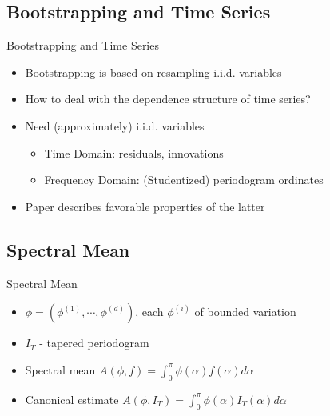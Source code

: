 
\subsection{Bootstrapping and Time Series}
\begin{frame}{Bootstrapping and Time Series}

\begin{itemize}
\item Bootstrapping is based on resampling i.i.d. variables

\item How to deal with the dependence structure of time series?

\item Need (approximately) i.i.d. variables
\begin{itemize}
\item Time Domain: residuals, innovations
\item Frequency Domain: (Studentized) periodogram ordinates
\end{itemize}

\item Paper describes favorable properties of the latter

\end{itemize}
\end{frame}



\subsection{Spectral Mean}
\begin{frame}{Spectral Mean}
\begin{itemize}

\item $\phi = (\phi^{(1)},\cdots,\phi^{(d)})$, each $\phi^{(i)}$ of bounded variation

\item $I_T$ - tapered periodogram

\item Spectral mean $A(\phi, f) = \int_0^\pi \phi(\alpha)f(\alpha)d\alpha$

\item Canonical estimate $A(\phi,I_T) = \int_0^\pi \phi(\alpha)I_T(\alpha)d\alpha$

\end{itemize}
\end{frame}



